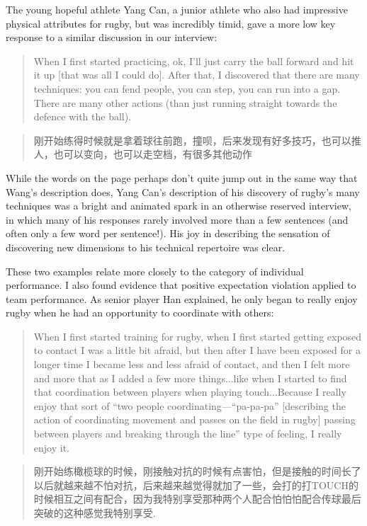 \begin{CJK}{UTF8}{gbsn}
The young hopeful athlete Yang Can, a junior athlete who also had impressive physical attributes for rugby, but was incredibly timid, gave a more low key response to a similar discussion in our interview:

    \begin{quote}
      When I first started practicing, ok, I’ll just carry the ball forward and hit it up [that was all I could do]. After that, I discovered that there are many techniques: you can fend people, you can step, you can run into a gap. There are many other actions (than just running straight towards the defence with the ball).
    \end{quote}

    \begin{quote}
      刚开始练得时候就是拿着球往前跑，撞呗，后来发现有好多技巧，也可以推人，也可以变向，也可以走空档，有很多其他动作
    \end{quote}

While the words on the page perhaps don't quite jump out in the same way that Wang's description does, Yang Can's description of his discovery of rugby's many techniques was a bright and animated spark in an otherwise reserved interview, in which many of his responses rarely involved more than a few sentences (and often only a few word per sentence!).  His joy in describing the sensation of discovering new dimensions to his technical repertoire was clear.

These two examples relate more closely to the category of individual performance.  I also found evidence that positive expectation violation applied to team performance.  As senior player Han explained, he only began to really enjoy rugby when he had an opportunity to coordinate with others:

\begin{quote}
    When I first started training for rugby, when I first started getting exposed to contact I was a little bit afraid, but then after I have been exposed for a longer time I became less and less afraid of contact, and then I felt more and more that as I added a few more things...like when I started to find that coordination between players when playing touch...Because I really enjoy that sort of ``two people coordinating---``pa-pa-pa'' [describing the action of coordinating movement and passes on the field in rugby] passing between players and breaking through the line'' type of feeling, I really enjoy it.
\end{quote}

\begin{quote}
      刚开始练橄榄球的时候，刚接触对抗的时候有点害怕，但是接触的时间长了以后就越来越不怕对抗，后来越来越觉得就加了一些，会打的打TOUCH的时候相互之间有配合，因为我特别享受那种两个人配合怕怕怕配合传球最后突破的这种感觉我特别享受.
\end{quote}


\end{CJK}
